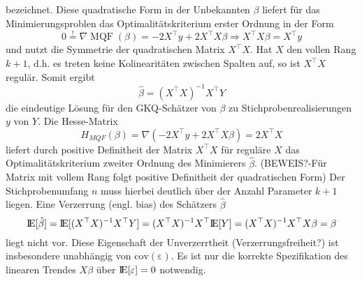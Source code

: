 bezeichnet. Diese quadratische Form in der Unbekannten $\beta$ liefert für das Minimierungsproblen das 
Optimalitätskriterium erster Ordnung in der Form
\begin{equation*}
    0 \overset{!}{=} \nabla \operatorname{MQF}(\beta)= -2 X^{\top} y + 2 X^{\top} X \beta \Rightarrow X^{\top} X \beta=X^{\top} y
\end{equation*}
und nutzt die Symmetrie der quadratischen Matrix $X^{\top}X$. 
Hat $X$ den vollen Rang $k+1$, d.h. es treten keine Kolinearitäten zwischen Spalten auf, 
so ist $X^{\top}X$ regulär. Somit ergibt
\begin{equation}
    \hat{\beta} = (X^{\top}X)^{-1} X^{\top} Y
\end{equation}
die eindeutige Lösung für den GKQ-Schätzer von $\beta$ zu Stichprobenrealisierungen $y$ von $Y$. 
Die Hesse-Matrix
\begin{equation*}
    H_{MQF}(\beta)=\nabla (-2 X^{\top} y + 2 X^{\top} X \beta) = 2 X^{\top} X
\end{equation*}
liefert durch positive Definitheit der Matrix $X^{\top} X$ für reguläre $X$ das
Optimalitätskriterium zweiter Ordnung des Minimierers $\hat{\beta}$.
(BEWEIS?-Für Matrix mit vollem Rang folgt positive Definitheit der quadratischen Form)
Der Stichprobenumfang $n$ muss hierbei deutlich über der Anzahl Parameter $k+1$ liegen.
Eine Verzerrung (engl. bias) des Schätzers $\hat{\beta}$ 
\begin{equation*}
    {\rm I\!E}[\hat{\beta}]={\rm I\!E}[(X^{\top}X)^{-1} X^{\top} Y] = 
    (X^{\top}X)^{-1} X^{\top} {\rm I\!E}[Y] = (X^{\top}X)^{-1} X^{\top} X \beta = \beta
\end{equation*}
liegt nicht vor. Diese Eigenschaft der Unverzerrtheit (Verzerrungsfreiheit?) ist 
insbesondere unabhängig von $\operatorname{cov(\varepsilon)}$. Es ist nur die korrekte 
Spezifikation des linearen Trendes $X \beta$ über ${\rm I\!E}[\varepsilon]=0$ notwendig.

